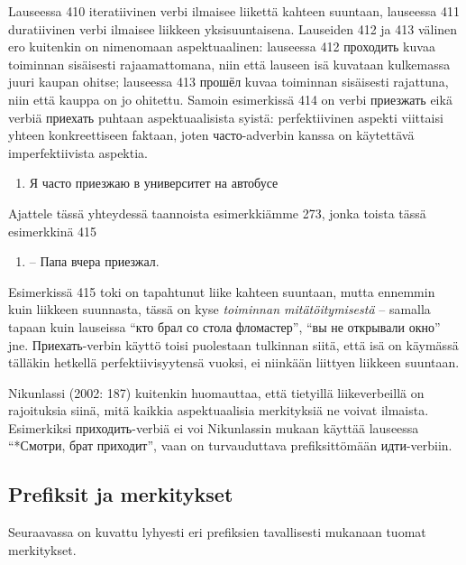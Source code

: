 \documentclass[]{scrartcl}
\providecommand{\tightlist}{%
  \setlength{\itemsep}{0pt}\setlength{\parskip}{0pt}}
\begin{document}
Lauseessa 410 iteratiivinen verbi ilmaisee liikettä kahteen suuntaan,
lauseessa 411 duratiivinen verbi ilmaisee liikkeen yksisuuntaisena.
Lauseiden 412 ja 413 välinen ero kuitenkin on nimenomaan aspektuaalinen:
lauseessa 412 проходить kuvaa toiminnan sisäisesti rajaamattomana, niin
että lauseen isä kuvataan kulkemassa juuri kaupan ohitse; lauseessa 413
прошёл kuvaa toiminnan sisäisesti rajattuna, niin että kauppa on jo
ohitettu. Samoin esimerkissä 414 on verbi приезжать eikä verbiä приехать
puhtaan aspektuaalisista syistä: perfektiivinen aspekti viittaisi yhteen
konkreettiseen faktaan, joten часто-adverbin kanssa on käytettävä
imperfektiivista aspektia.

\begin{enumerate}
\def\labelenumi{(\arabic{enumi})}
\setcounter{enumi}{413}
\tightlist
\item
  Я часто приезжаю в университет на автобусе
\end{enumerate}

Ajattele tässä yhteydessä taannoista esimerkkiämme 273, jonka toista
tässä esimerkkinä 415

\begin{enumerate}
\def\labelenumi{(\arabic{enumi})}
\setcounter{enumi}{414}
\tightlist
\item
  -- Папа вчера приезжал.
\end{enumerate}

Esimerkissä 415 toki on tapahtunut liike kahteen suuntaan, mutta
ennemmin kuin liikkeen suunnasta, tässä on kyse \emph{toiminnan
mitätöitymisestä} -- samalla tapaan kuin lauseissa ``кто брал со стола
фломастер'', ``вы не открывали окно'' jne. Приехать-verbin käyttö toisi
puolestaan tulkinnan siitä, että isä on käymässä tälläkin hetkellä
perfektiivisyytensä vuoksi, ei niinkään liittyen liikkeen suuntaan.

Nikunlassi (2002: 187) kuitenkin huomauttaa, että tietyillä
liikeverbeillä on rajoituksia siinä, mitä kaikkia aspektuaalisia
merkityksiä ne voivat ilmaista. Esimerkiksi приходить-verbiä ei voi
Nikunlassin mukaan käyttää lauseessa ``*Смотри, брат приходит'', vaan on
turvauduttava prefiksittömään идти-verbiin.

\subsection{Prefiksit ja merkitykset}\label{prefiksit-ja-merkitykset}

Seuraavassa on kuvattu lyhyesti eri prefiksien tavallisesti mukanaan
tuomat merkitykset.
\end{document}
